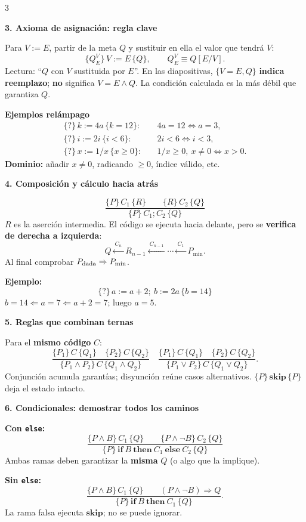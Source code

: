 \documentclass[10pt,letterpaper]{article}
\newcommand{\Htriple}[3]{\{#1\}\,#2\,\{#3\}}
\newcommand{\topic}[1]{%
  \vspace{1.0pt}\colorbox{azulclaro}{%
    \parbox{\dimexpr\linewidth-2\fboxsep\relax}{\color{azul}\bfseries #1}}\vspace{0.5pt}}
\newcommand{\alerta}[1]{\textcolor{rojo}{\bfseries #1}}
\begin{document}
\begin{multicols*}{3}
\topic{3. Axioma de asignación: regla clave}

Para $V:=E$, partir de la meta $Q$ y sustituir en ella el valor que tendrá $V$:
\[
\boxed{\Htriple{Q_E^V}{V:=E}{Q}},\qquad
Q_E^V\equiv Q[E/V].
\]
Lectura: ``$Q$ con $V$ sustituida por $E$''. En las diapositivas,
$\{V=E,Q\}$ \textbf{indica reemplazo}; \alerta{no} significa $V=E\land Q$.
La condición calculada es la más débil que garantiza $Q$.

\textbf{Ejemplos relámpago}
\[
\begin{aligned}
\Htriple{?}{k:=4a}{k=12}:&\quad 4a=12\iff\boxed{a=3},\\
\Htriple{?}{i:=2i}{i<6}:&\quad 2i<6\iff\boxed{i<3},\\
\Htriple{?}{x:=1/x}{x\ge0}:&\quad 1/x\ge0,\ x\ne0\iff\boxed{x>0}.
\end{aligned}
\]
\alerta{Dominio:} añadir $x\ne0$, radicando $\ge0$, índice válido, etc.

\topic{4. Composición y cálculo hacia atrás}

\[
\boxed{
\frac{\Htriple{P}{C_1}{R}\qquad\Htriple{R}{C_2}{Q}}
     {\Htriple{P}{C_1;C_2}{Q}}}
\]
$R$ es la aserción intermedia. El código se ejecuta hacia delante, pero se
\textbf{verifica de derecha a izquierda}:
\[
Q\xleftarrow{\ C_n\ }R_{n-1}\xleftarrow{\ C_{n-1}\ }\cdots
\xleftarrow{\ C_1\ }P_{\min}.
\]
Al final comprobar $P_{\rm dada}\Rightarrow P_{\min}$.

\textbf{Ejemplo:}
\[
\Htriple{?}{a:=a+2;\ b:=2a}{b=14}
\]
$b=14\Leftarrow a=7\Leftarrow a+2=7$; luego $\boxed{a=5}$.

\topic{5. Reglas que combinan ternas}

Para el \textbf{mismo código} $C$:
\[
\frac{\Htriple{P_1}{C}{Q_1}\quad\Htriple{P_2}{C}{Q_2}}
     {\Htriple{P_1\land P_2}{C}{Q_1\land Q_2}}
\quad
\frac{\Htriple{P_1}{C}{Q_1}\quad\Htriple{P_2}{C}{Q_2}}
     {\Htriple{P_1\lor P_2}{C}{Q_1\lor Q_2}}.
\]
Conjunción acumula garantías; disyunción reúne casos alternativos.
$\Htriple{P}{\mathbf{skip}}{P}$ deja el estado intacto.

\topic{6. Condicionales: demostrar todos los caminos}

\textbf{Con \texttt{else}:}
\[
\boxed{
\frac{\Htriple{P\land B}{C_1}{Q}\qquad
      \Htriple{P\land\neg B}{C_2}{Q}}
     {\Htriple{P}{\mathbf{if}\ B\ \mathbf{then}\ C_1\ \mathbf{else}\ C_2}{Q}}}
\]
Ambas ramas deben garantizar la \textbf{misma} $Q$ (o algo que la implique).

\textbf{Sin \texttt{else}:}
\[
\frac{\Htriple{P\land B}{C_1}{Q}\qquad(P\land\neg B)\Rightarrow Q}
     {\Htriple{P}{\mathbf{if}\ B\ \mathbf{then}\ C_1}{Q}}.
\]
La rama falsa ejecuta $\mathbf{skip}$; no se puede ignorar.


\end{multicols*}
\end{document}
